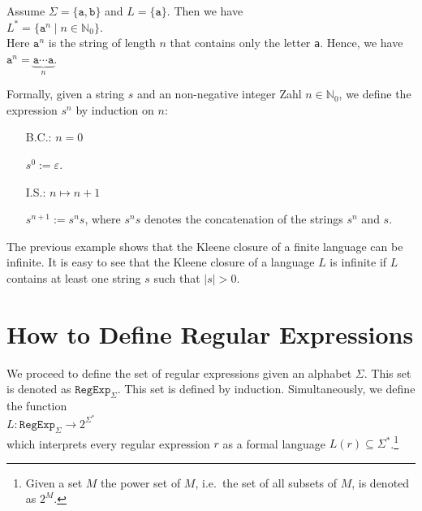 \exampleEng
Assume $\Sigma = \{ \texttt{a}, \texttt{b} \}$ and  $L = \{ \texttt{a} \}$.  Then we have
\\[0.2cm]
\hspace*{1.3cm}
$L^* = \{ \texttt{a}^n \mid n \in \mathbb{N}_0 \}$.
\\[0.2cm]
Here $\texttt{a}^n$ is the string of length $n$ that contains only the letter \texttt{a}.  Hence, we have 
\\[0.2cm]
\hspace*{1.3cm}
$\texttt{a}^n = \underbrace{\texttt{a} \cdots \texttt{a}}_n$.  \eox 


Formally, given a string $s$ and an non-negative integer Zahl $n \in \mathbb{N}_0$, we define the expression
 $s^n$ by induction on  $n$:
\begin{enumerate}
\item[B.C.:] $n = 0$

             $s^0 := \varepsilon$. 
\item[I.S.:] $n \mapsto n + 1$

             $s^{n+1} := s^n s$, \quad where $s^n s$ denotes the concatenation of the strings $s^n$ and $s$.
             \eox
\end{enumerate}

The previous example shows that the Kleene closure of a finite language can be infinite.
It is easy to see that the Kleene closure of a language $L$ is infinite
if $L$ contains at least one string $s$ such that $|s| > 0$.
\vspace*{0.3cm}

\section{How to Define Regular Expressions}
We proceed to define the set of regular expressions given an  alphabet $\Sigma$.  This set is
denoted as $\texttt{RegExp}_\Sigma$.  This set is defined by induction.  Simultaneously,  we define
the function
\\[0.2cm]
\hspace*{1.3cm}
$L: \texttt{RegExp}_\Sigma \rightarrow 2^{\Sigma^*}$
\\[0.2cm]
which interprets every regular expression  $r$ as a formal language $L(r) \subseteq \Sigma^*$.\footnote{
  Given a set $M$ the power set of $M$, i.e.~the set of all subsets of $M$, is denoted as $2^M$.
}

